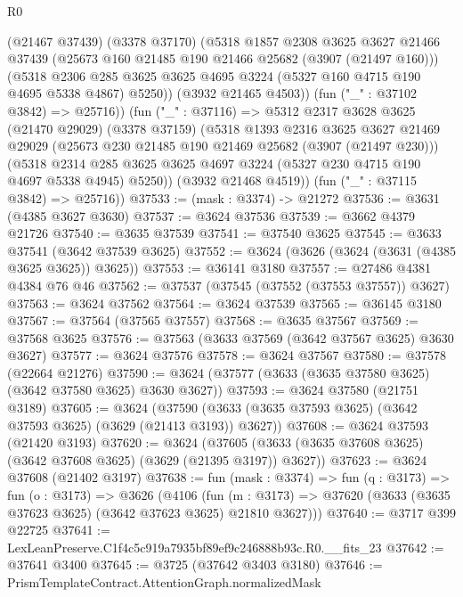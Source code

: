 \begin{lexlean}{R0}
\begin{coremodule}
          (@21467 @37439)
          (@3378 @37170)
          (@5318
            @1857
            @2308
            @3625
            @3627
            @21466
            @37439
            (@25673 @160 @21485 @190 @21466 @25682 (@3907 (@21497 @160)))
            (@5318
              @2306
              @285
              @3625
              @3625
              @4695
              @3224
              (@5327 @160 @4715 @190 @4695 @5338 @4867)
              @5250))
          (@3932 @21465 @4503))
        (fun ("_" : @37102 @3842) => @25716))
      (fun ("_" : @37116) =>
      @5312
        @2317
        @3628
        @3625
        (@21470 @29029)
        (@3378 @37159)
        (@5318
          @1393
          @2316
          @3625
          @3627
          @21469
          @29029
          (@25673 @230 @21485 @190 @21469 @25682 (@3907 (@21497 @230)))
          (@5318
            @2314
            @285
            @3625
            @3625
            @4697
            @3224
            (@5327 @230 @4715 @190 @4697 @5338 @4945)
            @5250))
        (@3932 @21468 @4519))
      (fun ("_" : @37115 @3842) => @25716))
@37533 := (mask : @3374) -> @21272
@37536 := @3631 (@4385 @3627 @3630)
@37537 := @3624 @37536
@37539 := @3662 @4379 @21726
@37540 := @3635 @37539
@37541 := @37540 @3625
@37545 := @3633 @37541 (@3642 @37539 @3625)
@37552 := @3624 (@3626 (@3624 (@3631 (@4385 @3625 @3625)) @3625))
@37553 := @36141 @3180
@37557 := @27486 @4381 @4384 @76 @46
@37562 := @37537 (@37545 (@37552 (@37553 @37557)) @3627)
@37563 := @3624 @37562
@37564 := @3624 @37539
@37565 := @36145 @3180
@37567 := @37564 (@37565 @37557)
@37568 := @3635 @37567
@37569 := @37568 @3625
@37576 := @37563 (@3633 @37569 (@3642 @37567 @3625) @3630 @3627)
@37577 := @3624 @37576
@37578 := @3624 @37567
@37580 := @37578 (@22664 @21276)
@37590 := @3624 (@37577 (@3633 (@3635 @37580 @3625) (@3642 @37580 @3625) @3630 @3627))
@37593 := @3624 @37580 (@21751 @3189)
@37605 := @3624
    (@37590 (@3633 (@3635 @37593 @3625) (@3642 @37593 @3625) (@3629 (@21413 @3193)) @3627))
@37608 := @3624 @37593 (@21420 @3193)
@37620 := @3624
    (@37605 (@3633 (@3635 @37608 @3625) (@3642 @37608 @3625) (@3629 (@21395 @3197)) @3627))
@37623 := @3624 @37608 (@21402 @3197)
@37638 := fun (mask : @3374) =>
  fun (q : @3173) =>
  fun (o : @3173) =>
  @3626
    (@4106
      (fun (m : @3173) => @37620 (@3633 (@3635 @37623 @3625) (@3642 @37623 @3625) @21810 @3627)))
@37640 := @3717 @399 @22725
@37641 := LexLeanPreserve.C1f4c5c919a7935bf89ef9c246888b93c.R0.__fits_23
@37642 := @37641 @3400
@37645 := @3725 (@37642 @3403 @3180)
@37646 := PrismTemplateContract.AttentionGraph.normalizedMask

\end{coremodule}
\end{lexlean}

